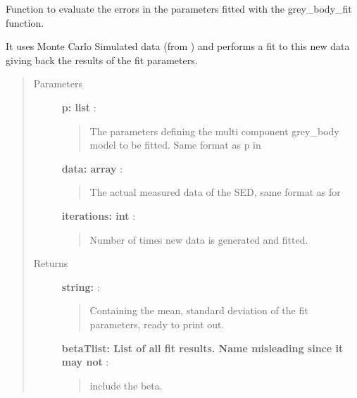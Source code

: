 \documentclass[a4paper,10pt,english]{sphinxmanual}
\begin{document}
\begin{fulllineitems}
\label{functions:astrolyze.functions.astro_functions.grey_body_monte_carlo}
Function to evaluate the errors in the parameters fitted with the
grey\_body\_fit function.

It uses Monte Carlo Simulated data (from
{\hyperref[functions:astrolyze.functions.astro_functions.generate_monte_carlo_data_sed]{}}) and performs a fit to this new data
giving back the results of the fit parameters.
\begin{quote}\begin{description}
\item[{Parameters }] \leavevmode
\textbf{p: list} :
\begin{quote}

The parameters defining the multi component grey\_body model to be
fitted. Same format as p in {\hyperref[functions:astrolyze.functions.astro_functions.multi_component_grey_body]{}}
\end{quote}

\textbf{data: array} :
\begin{quote}

The actual measured data of the SED, same format as for
\end{quote}

\textbf{iterations: int} :
\begin{quote}

Number of times new data is generated and fitted.
\end{quote}

\item[{Returns }] \leavevmode
\textbf{string:} :
\begin{quote}

Containing the mean, standard deviation of the fit parameters, ready
to print out.
\end{quote}

\textbf{betaTlist: List of all fit results. Name misleading since it may not} :
\begin{quote}

include the beta.
\end{quote}

\end{description}\end{quote}

\end{fulllineitems}
\end{document}
